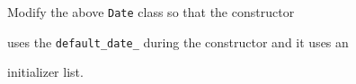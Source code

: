 Modify the above \texttt{Date} class so that the constructor

uses the \texttt{default\_date\_} during the constructor and it uses an

initializer list.

